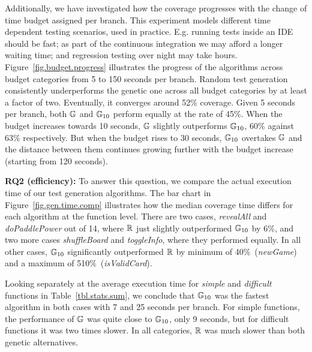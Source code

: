 Additionally, we have investigated how the coverage progresses with the change of time budget assigned per branch. This experiment models different time dependent testing scenarios, used in practice. E.g. running tests inside an IDE should be fast; as part of the continuous integration we may afford a longer waiting time; and regression testing over night may take hours. Figure~\ref{fig.budget.progress} illustrates the progress of the algorithms across budget categories from 5 to 150 seconds per branch. Random test generation consistently underperforms the genetic one across all budget categories by at least a factor of two. Eventually, it converges around 52\% coverage. Given 5 seconds per branch, both $\mathbb{G}$ and $\mathbb{G}_{10}$ perform equally at the rate of 45\%. When the budget increases towards 10 seconds, $\mathbb{G}$ slightly outperforms $\mathbb{G}_{10}$, 60\% against 63\% respectively. But when the budget rises to 30 seconds, $\mathbb{G}_{10}$ overtakes $\mathbb{G}$ and the distance between them continues growing further with the budget increase (starting from 120 seconds).\\

\textbf{RQ2 (efficiency):} To answer this question, we compare the actual execution time of our test generation algorithms. The bar chart in Figure~\ref{fig.gen.time.comp} illustrates how the median coverage time differs for each algorithm at the function level. There are two cases, \emph{revealAll} and \emph{doPaddlePower} out of 14, where $\mathbb{R}$ just slightly outperformed $\mathbb{G}_{10}$ by 6\%, and two more cases \emph{shuffleBoard} and \emph{toggleInfo}, where they performed equally. In all other cases, $\mathbb{G}_{10}$ significantly outperformed $\mathbb{R}$ by minimum of 40\%~(\emph{newGame}) and a maximum of 510\%~(\emph{isValidCard}).

Looking separately at the average execution time for \emph{simple} and \emph{difficult} functions in Table~\ref{tbl.stats.sum}, we conclude that $\mathbb{G}_{10}$ was the fastest algorithm in both cases with  7 and 25 seconds per branch. For simple functions, the performance of $\mathbb{G}$ was quite close to $\mathbb{G}_{10}$, only 9 seconds, but for difficult functions it was two times slower. In all categories, $\mathbb{R}$ was much slower than both genetic alternatives.\\

